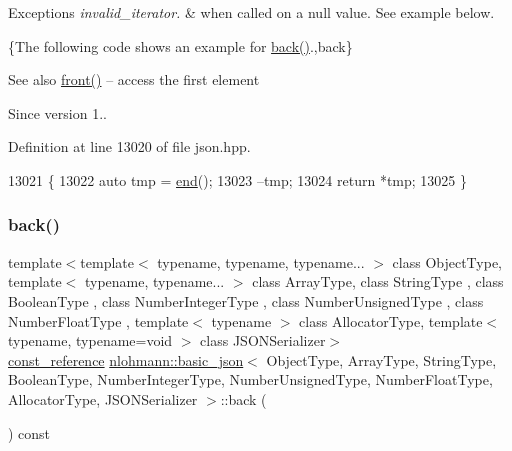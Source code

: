 \begin{DoxyExceptions}{Exceptions}
{\em invalid\+\_\+iterator.} & when called on a {\ttfamily null} value. See example below.\\
\hline
\end{DoxyExceptions}
\{The following code shows an example for {\ttfamily \hyperlink{classnlohmann_1_1basic__json_a011397134847f36db0ed7d7a93753677}{back()}}.,back\}

\begin{DoxySeeAlso}{See also}
\hyperlink{classnlohmann_1_1basic__json_a3acba9c6ceb7214e565fe08c3ba5b352}{front()} -- access the first element
\end{DoxySeeAlso}
\begin{DoxySince}{Since}
version 1.. 
\end{DoxySince}


Definition at line 13020 of file json.\+hpp.


\begin{DoxyCode}
13021     \{
13022         \textcolor{keyword}{auto} tmp = \hyperlink{classnlohmann_1_1basic__json_a13e032a02a7fd8a93fdddc2fcbc4763c}{end}();
13023         --tmp;
13024         \textcolor{keywordflow}{return} *tmp;
13025     \}
\end{DoxyCode}
\mbox{\label{classnlohmann_1_1basic__json_a83fe4a151b3a591f357527d5d9aa1b9f}} 
\subsubsection{\texorpdfstring{back()}{back()}\hspace{0.1cm}{\footnotesize\ttfamily [2/2]}}
{\footnotesize\ttfamily template$<$template$<$ typename, typename, typename... $>$ class Object\+Type, template$<$ typename, typename... $>$ class Array\+Type, class String\+Type , class Boolean\+Type , class Number\+Integer\+Type , class Number\+Unsigned\+Type , class Number\+Float\+Type , template$<$ typename $>$ class Allocator\+Type, template$<$ typename, typename=void $>$ class J\+S\+O\+N\+Serializer$>$ \\
\hyperlink{classnlohmann_1_1basic__json_a4057c5425f4faacfe39a8046871786ca}{const\+\_\+reference} \hyperlink{classnlohmann_1_1basic__json}{nlohmann\+::basic\+\_\+json}$<$ Object\+Type, Array\+Type, String\+Type, Boolean\+Type, Number\+Integer\+Type, Number\+Unsigned\+Type, Number\+Float\+Type, Allocator\+Type, J\+S\+O\+N\+Serializer $>$\+::back (\begin{DoxyParamCaption}{ }\end{DoxyParamCaption}) const\hspace{0.3cm}{\ttfamily [inline]}}



